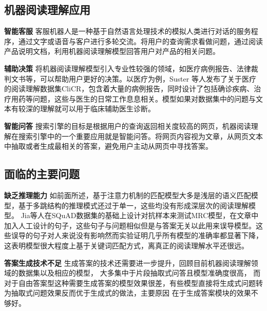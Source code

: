 \subsection{机器阅读理解应用}

\textbf{智能客服} \quad
客服机器人是一种基于自然语言处理技术的模拟人类进行对话的服务程序，通过文字或语音与客户进行多轮交流。将用户的查询需求看做问题，通过阅读产品说明文档，利用机器阅读理解模型回答用户对产品的相关问题。

\textbf{辅助决策} \quad
将机器阅读理解模型引入专业性较强的领域，如医疗病例报告、法律裁判文书等，可以帮助用户更好的决策。以医疗为例，Suster
等人发布了关于医疗的阅读理解数据集CliCR，包含着大量的病例报告，同时设计了包括确诊疾病、治疗用药等问题，这些与医生的日常工作息息相关。模型如果对数据集中的问题与文本有较深的理解就可以用于临床辅助医生诊断。

\textbf{智能问答} \quad
搜索引擎的目标是根据用户的查询返回相关度较高的网页，机器阅读理解在搜索引擎中的一个重要应用就是智能问答。将网页内容视为文章，从网页文本中抽取或者生成最相关的答案，避免用户主动从网页中寻找答案。

\subsection{面临的主要问题}

\textbf{缺乏推理能力} \quad
如前面所述，基于注意力机制的匹配模型大多是浅层的语义匹配模型，基于多跳结构的推理模式还过于单一，这些均没有形成深层次的阅读理解模型。
Jia等人在SQuAD数据集的基础上设计对抗样本来测试MRC模型，在文章中加入人工设计的句子，这些句子与问题相似但是与答案无关以此用来误导模型。这些误导的句子对人来说没有影响然而实验证明几乎所有模型的准确率都显著下降，这表明模型很大程度上基于关键词匹配方式，离真正的阅读理解水平还很远。

\textbf{答案生成技术不足} \quad
生成答案的技术还需要进一步提升，回顾目前机器阅读理解领域的数据集以及相应的模型，
大多集中于片段抽取式问答且模型准确度很高，
而对于自由答案型这种需要生成答案的模型效果很差，有些模型直接将生成式问题转为抽取式问题效果反而优于生成式的做法，主要原因
在于生成答案模块的效果不够好。

